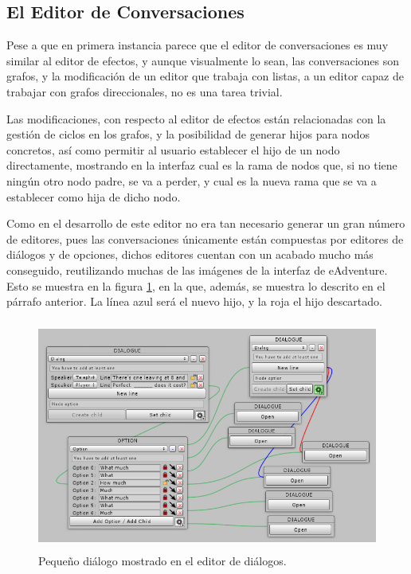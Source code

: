 \subsection{El Editor de Conversaciones}

Pese a que en primera instancia parece que el editor de conversaciones es muy similar al editor de efectos, y aunque visualmente lo sean, las conversaciones son grafos, y la modificación de un editor que trabaja con listas, a un editor capaz de trabajar con grafos direccionales, no es una tarea trivial. 

Las modificaciones, con respecto al editor de efectos están relacionadas con la gestión de ciclos en los grafos, y la posibilidad de generar hijos para nodos concretos, así como permitir al usuario establecer el hijo de un nodo directamente, mostrando en la interfaz cual es la rama de nodos que, si no tiene ningún otro nodo padre, se va a perder, y cual es la nueva rama que se va a establecer como hija de dicho nodo.

Como en el desarrollo de este editor no era tan necesario generar un gran número de editores, pues las conversaciones únicamente están compuestas por editores de diálogos y de opciones, dichos editores cuentan con un acabado mucho más conseguido, reutilizando muchas de las imágenes de la interfaz de eAdventure. Esto se muestra en la figura \ref{small-dialog-it3}, en la que, además, se muestra lo descrito en el párrafo anterior. La línea azul será el nuevo hijo, y la roja el hijo descartado.

\begin{figure}[h!]
	\centerline{\includegraphics[height=3in]{figures/it3/small-dialog.png}}
	\caption[Pequeño diálogo - Editor de Diálogos]{Pequeño diálogo mostrado en el editor de diálogos.}
	\label{small-dialog-it3}
\end{figure}

